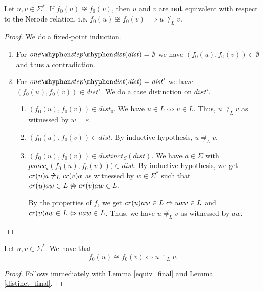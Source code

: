 \begin{lemma}
    \label{distinct_final}
    Let $u,v \in \Sigma^*$. 
    If ${f_0}(u) \not\cong {f_0}(v)$, then $u$ and $v$ are \textbf{not} equivalent with respect to the Nerode relation, i.e. ${f_0}(u) \not\cong {f_0}(v) \implies u \not\doteq_L v$.
\end{lemma}
\begin{proof}
    We do a fixed-point induction.
    \begin{enumerate}
        \item For $\mathit{one\mhyphen step\mhyphen dist}(\mathit{dist}) = \emptyset$ we have $({f_0}(u), {f_0}(v)) \in \emptyset$ and thus a contradiction. 
        \item For $\mathit{one\mhyphen step\mhyphen dist}(\mathit{dist}) = \mathit{dist'}$ we have $({f_0}(u), {f_0}(v)) \in \mathit{dist'}$. 
            We do a case distinction on $\mathit{dist'}$.
            \begin{enumerate}
                \item $({f_0}(u), {f_0}(v)) \in \mathit{dist_0}$.
                    We have $u \in L \not\Leftrightarrow v \in L$. 
                    Thus, $u \not\doteq_L v$ as witnessed by $w=\varepsilon$.
                \item $({f_0}(u), {f_0}(v)) \in \mathit{dist}$. 
                    By inductive hypothesis, $u \not\doteq_L v$.
                \item $({f_0}(u), {f_0}(v)) \in \mathit{distinct_S}(\mathit{dist})$.
                    We have $a \in \Sigma$ with $\mathit{psucc_a}({f_0}(u), {f_0}(v))) \in \mathit{dist}$.
                    By inductive hypothesis, we get $cr(u)a \not\doteq_L cr(v)a$ 
                    as witnessed by $w \in \Sigma^*$ 
                    such that $cr(u)aw \in L \not\Leftrightarrow cr(v)aw \in L$.

                    By the properties of $f$, we get $cr(u)aw \in L \Leftrightarrow uaw \in L$ and $cr(v)aw \in L \Leftrightarrow vaw \in L$.
                    Thus, we have $u \not\doteq_L v$ as witnessed by $aw$.
            \end{enumerate}
    \end{enumerate}
\end{proof}


\begin{corollary}
    \label{equivP}
    Let $u, v \in \Sigma^*$. We have that
    \begin{equation*}
        {f_0}(u) \cong {f_0}(v) \iff u \doteq_L v.
    \end{equation*}
\end{corollary}
\begin{proof}
    Follows immediately with Lemma \ref{equiv_final} and Lemma \ref{distinct_final}. 
\end{proof}


